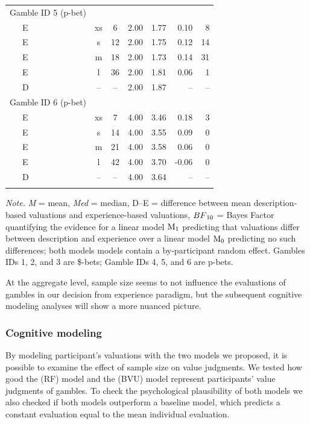 \documentclass[
  a4paper, man, floatsintext]{apa6}
\begin{document}
\begin{table}[tbp]
\begin{center}
\begin{threeparttable}
\begin{tabular}{lccccrr}
Gamble ID 5 (p-bet) &  &  &  &  &  & \\
\ \ \ E & xs & 6 & 2.00 & 1.77 & 0.10 & 8\\
\ \ \ E & s & 12 & 2.00 & 1.75 & 0.12 & 14\\
\ \ \ E & m & 18 & 2.00 & 1.73 & 0.14 & 31\\
\ \ \ E & l & 36 & 2.00 & 1.81 & 0.06 & 1\\
\ \ \ D & -- & -- & 2.00 & 1.87 & -- & --\\
Gamble ID 6 (p-bet) &  &  &  &  &  & \\
\ \ \ E & xs & 7 & 4.00 & 3.46 & 0.18 & 3\\
\ \ \ E & s & 14 & 4.00 & 3.55 & 0.09 & 0\\
\ \ \ E & m & 21 & 4.00 & 3.58 & 0.06 & 0\\
\ \ \ E & l & 42 & 4.00 & 3.70 & -0.06 & 0\\
\ \ \ D & -- & -- & 4.00 & 3.64 & -- & --\\
\bottomrule
\addlinespace
\end{tabular}

\begin{tablenotes}[para]
\normalsize{\textit{Note.} \textit{M} = mean, \textit{Med} = median, D--E = difference between mean description-based valuations and experience-based valuations, $BF\textsubscript{10}$ = Bayes Factor quantifying the evidence for a linear model $\mathrm{M}\textsubscript{1}$ predicting that valuations differ between description and experience over a linear model $\mathrm{M}\textsubscript{0}$ predicting no such differences; both models models contain a by-participant random effect. Gambles IDs 1, 2, and 3 are \$-bets; Gamble IDs 4, 5, and 6 are p-bets.}
\end{tablenotes}

\end{threeparttable}
\end{center}

\end{table}

At the aggregate level, sample size seems to not influence the
evaluations of gambles in our decision from experience paradigm, but the
subsequent cognitive modeling analyses will show a more nuanced picture.

\subsubsection{Cognitive modeling}

By modeling participant's valuations with the two models we proposed, it
is possible to examine the effect of sample size on value judgments. We
tested how good the  (RF) model and the
 (BVU) model represent
participants' value judgments of gambles. To check the psychological
plausibility of both models we also checked if both models outperform a
baseline model, which predicts a constant evaluation equal to the mean
individual evaluation.
\end{document}
